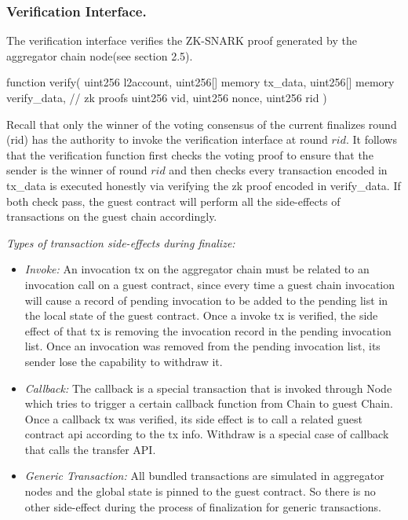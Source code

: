 \subsubsection*{Verification Interface.}
The verification interface verifies the ZK-SNARK proof generated by the aggregator chain node(see section 2.5).
\begin{code}
function verify(
  uint256 l2account,
  uint256[] memory tx_data,
  uint256[] memory verify_data, // zk proofs 
  uint256 vid,
  uint256 nonce,
  uint256 rid
)
\end{code}

Recall that only the winner of the voting consensus of the current finalizes round (rid) has the authority to invoke the verification interface at round $rid$. It follows that the verification function first checks the voting proof to ensure that the sender is the winner of round $rid$ and then checks every transaction encoded in tx\_data is executed honestly via verifying the zk proof encoded in verify\_data. If both check pass, the guest contract will perform all the side-effects of transactions on the guest chain accordingly.

\smallskip\noindent\emph{Types of transaction side-effects during finalize:}
\begin{itemize}[leftmargin=*]
\item \emph{Invoke:}
    An invocation tx on the aggregator chain must be related to an invocation call on a guest contract, since every time a guest chain invocation will cause a record of pending invocation to be added to the pending list in the local state of the guest contract.
    Once a invoke tx is verified, the side effect of that tx is removing the invocation record in the pending invocation list.
    Once an invocation was removed from the pending invocation list, its sender lose the capability to withdraw it.

\item \emph{Callback:}
    The callback is a special transaction that is invoked through \dprotocol Node which tries to trigger a certain callback function from \dprotocol Chain to guest Chain.
    Once a callback tx was verified, its side effect is to call a related guest contract api according to the tx info.
    Withdraw is a special case of callback that calls the transfer API.

\item \emph{Generic Transaction:}
    All bundled transactions are simulated in aggregator nodes and the global state is pinned to the guest contract. So there is no other side-effect during the process of finalization for generic transactions.
\end{itemize}
